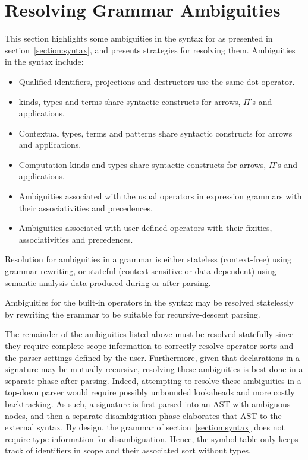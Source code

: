 \section{Resolving Grammar Ambiguities}\label{section:resolving-grammar-ambiguities}

This section highlights some ambiguities in the syntax for \Beluga as presented in section~\ref{section:syntax}, and presents strategies for resolving them.
Ambiguities in the syntax include:
\begin{itemize}
\item Qualified identifiers, projections and destructors use the same dot operator.
\item \LF kinds, types and terms share syntactic constructs for arrows, $ \Pi $'s and applications.
\item Contextual \LF types, terms and patterns share syntactic constructs for arrows and applications.
\item Computation kinds and types share syntactic constructs for arrows, $ \Pi $'s and applications.
\item Ambiguities associated with the usual operators in expression grammars with their associativities and precedences.
\item Ambiguities associated with user-defined operators with their fixities, associativities and precedences.
\end{itemize}

Resolution for ambiguities in a grammar is either stateless (context-free) using grammar rewriting, or stateful (context-sensitive or data-dependent) using semantic analysis data produced during or after parsing.

Ambiguities for the built-in operators in the syntax may be resolved statelessly by rewriting the grammar to be suitable for recursive-descent parsing.

The remainder of the ambiguities listed above must be resolved statefully since they require complete scope information to correctly resolve operator sorts and the parser settings defined by the user.
Furthermore, given that declarations in a \Beluga signature may be mutually recursive, resolving these ambiguities is best done in a separate phase after parsing.
Indeed, attempting to resolve these ambiguities in a top-down parser would require possibly unbounded lookaheads and more costly backtracking.
As such, a \Beluga signature is first parsed into an \ac{AST} with ambiguous nodes, and then a separate disambigution phase elaborates that \ac{AST} to the external syntax.
By design, the grammar of section~\ref{section:syntax} does not require type information for disambiguation.
Hence, the symbol table only keeps track of identifiers in scope and their associated sort without types.

